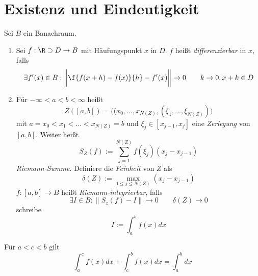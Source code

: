 %

\section{Existenz und Eindeutigkeit} %


\begin{df} \label{3.1}
	Sei $B$ ein Banachraum.
	\begin{enumerate}[1)]
		\item
			Sei $f: \R \supset D \to B$ mit Häufungspunkt $x$ in $D$.
			$f$ heißt \emph{differenzierbar} in $x$, falls
			\[
				\exists f'(x) \in B : \bigg\| \f{f(x+h)-f(x)}{h} - f'(x) \bigg\| \to 0
				\qquad k \to 0, x + k \in D
			\]
		\item
			Für $-\infty < a < b < \infty$ heißt
			\[
				Z([a,b]) = \Big( (x_0,\dotsc,x_{N(Z)}, (\xi_1, \dotsc, \xi_{N(Z)}) \Big)
			\]
			mit $a = x_0 < x_1 < \dotsc < x_{N(Z)} = b$ und $\xi_j \in [x_{j-1}, x_j]$ eine \emph{Zerlegung} von $[a,b]$.
			Weiter heißt
			\[
				S_Z(f) := \sum_{j=1}^{N(Z)} f(\xi_j)(x_j - x_{j-1})
			\]
			\emph{Riemann-Summe}.
			Definiere die \emph{Feinheit} von $Z$ als
			\[
				\delta(Z) := \max_{1\le j \le N(Z)} (x_j-x_{j-1})
			\]
			$f: [a,b] \to B$ heißt \emph{Riemann-integrierbar}, falls
			\[
				\exists I \in B : \|S_z(f) - I\| \to 0
				\qquad \delta(Z) \to 0
			\]
			schreibe
			\[
				I := \int_a^b f(x) dx
			\]
	\end{enumerate}
\end{df}

\begin{kor}[Folgerung] \label{3.2}
	Für $a < c < b$ gilt
	\[
		\int_a^c f(x) dx + \int_c^b f(x) dx = \int_a^b dx
	\]
\end{kor}

